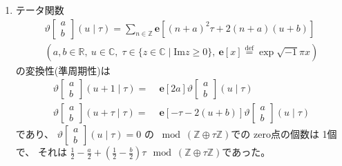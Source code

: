 \documentclass[12pt,b5paper]{ltjsarticle}
\begin{document}
\begin{enumerate}
 \item
      テータ関数
       \begin{gather}
        \vartheta \begin{bmatrix} a \\ b \end{bmatrix} (u \mid \tau)
        = \sum_{n\in\mathbb{Z}} \mathbf{e}
         \left[ (n+a)^{2}\tau + 2(n+a)(u+b) \right]\\
         \left(
        a,b\in\mathbb{R},\
        u\in\mathbb{C},\;
        \tau\in\{z\in\mathbb{C}\mid \mathrm{Im}z \geq 0\},\
        \mathbf{e}[x] \overset{\mathrm{def}}{=} %
        \exp{\sqrt{-1}\pi x}%
        \right)
       \end{gather}
       の変換性(準周期性)は
       \begin{align}
        \vartheta \begin{bmatrix} a \\ b \end{bmatrix} (u+1 \mid \tau)
        =&\; \mathbf{e} [2a]
        \vartheta \begin{bmatrix} a \\ b \end{bmatrix} (u \mid \tau)\\
        \vartheta \begin{bmatrix} a \\ b \end{bmatrix} (u+\tau \mid \tau)
        =&\; \mathbf{e} [-\tau -2(u+b)]
        \vartheta \begin{bmatrix} a \\ b \end{bmatrix} (u \mid \tau)
       \end{align}
       であり、
       $\displaystyle \vartheta \begin{bmatrix} a \\ b \end{bmatrix} (u \mid \tau) =0$ の
       $\bmod{(\mathbb{Z} \oplus \tau\mathbb{Z})}$での
       zero点の個数は 1個で、
       それは
       $\displaystyle \frac{1}{2} - \frac{a}{2} + \left( \frac{1}{2}-\frac{b}{2} \right)\tau \mod{(\mathbb{Z} \oplus \tau\mathbb{Z})}$であった。


\end{enumerate}
\end{document}
